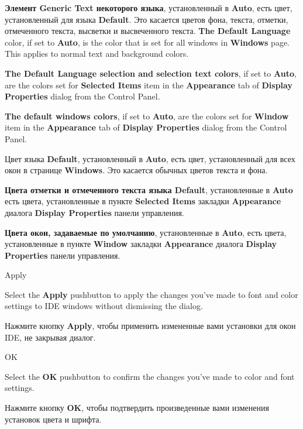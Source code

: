 {\bf Элемент Generic Text некоторого языка}, установленный в {\bf Auto},
есть цвет, установленный для языка {\bf Default}. Это касается цветов фона,
текста, отметки, отмеченного текста, высветки и высвеченного текста.
\fi
\ifenglish
{\bf The Default Language} color, if set to {\bf Auto},
is the color that is set for all windows in {\bf Windows} page.
This applies to normal text and background colors.

{\bf The Default Language selection and selection text colors},
if set to {\bf Auto}, are the colors
set for {\bf Selected Items} item in the {\bf Appearance} tab of
{\bf Display Properties} dialog from the Control Panel.

{\bf The default windows colors}, if set to {\bf Auto}, are the colors
set for {\bf Window} item in the {\bf Appearance} tab of
{\bf Display Properties} dialog from the Control Panel.

\else
Цвет языка {\bf Default}, установленный в {\bf Auto}, есть цвет, установленный
для всех окон в странице {\bf Windows}. Это касается обычных цветов текста и
фона.

{\bf Цвета отметки и отмеченного текста языка Default}, установленные в {\bf Auto}
есть цвета, установленные в пункте {\bf Selected Items} закладки {\bf Appearance}
диалога {\bf Display Properties} панели управления.

{\bf Цвета окон, задаваемые по умолчанию}, установленные в {\bf Auto}, есть цвета,
установленные в пункте {\bf Window} закладки {\bf Appearance}
диалога {\bf Display Properties} панели управления.
\fi

\begin{popup}
\caption{Apply}

\ifenglish
Select the {\bf Apply} pushbutton to apply the changes you've made to
font and color settings to IDE windows without dismissing the dialog.

\else
Нажмите кнопку {\bf Apply}, чтобы применить измененные вами установки
для окон IDE, не закрывая диалог.
\fi
\end{popup}

\begin{popup}
\caption{OK}

\ifenglish
Select the {\bf OK} pushbutton to confirm the changes you've made to
color and font settings.

\else
Нажмите кнопку {\bf OK}, чтобы подтвердить произведенные вами изменения
установок цвета и шрифта.
\fi
\end{popup}


